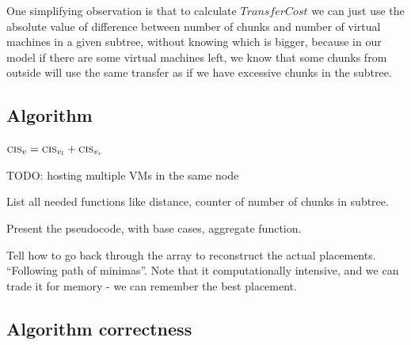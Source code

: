 One simplifying observation
is that to calculate $TransferCost$ we can just use the absolute
value of difference
between number of chunks and number of virtual machines in a given
subtree, without knowing which is bigger, because in our model if
there are some virtual machines left, we know that some chunks from
outside will use the same transfer as if we have excessive chunks in
the subtree.

\subsection{Algorithm}
\newcommand{\SumIndex}{\ensuremath{n}}
\begin{algorithm}[tbhp]
\DontPrintSemicolon %
\SetAlgoNoEnd
{}
$\textsc{cis}_{v} = \textsc{cis}_{v_l} + 
\textsc{cis}_{v_r}$\;
\For{$\SumIndex \in \{0,\dots,\Vms\}$}{
  \For{$i \in \{0,\dots,\SumIndex\}$}{
      \If{$\Opt_\SubstrateNode[\SumIndex] > \Opt_{\SubstrateNode_l}[i] + 
\Opt_{\SubstrateNode_r}[\SumIndex - i]$}{
	$\Opt_\SubstrateNode[\SumIndex] \gets \Opt_{\SubstrateNode_l}[i] + 
\Opt_{\SubstrateNode_r}[\SumIndex - i]$\;
    }
  }
  
 $bw \gets (\Vms - 
\SumIndex) \cdot \SumIndex \cdot \CostCom +   |i - 
\ChunkCount_\SubstrateNode| \cdot \CostTrans$\; 
  \eIf{$bw \leq \Capacity(\Uplink(v))$}{
    $\Opt_\SubstrateNode[\SumIndex] \gets \Opt_\SubstrateNode[\SumIndex] + bw$\;
  }{
    $\Opt_\SubstrateNode[\SumIndex] \gets \infty$\;
  }
}
%
\caption{$aggregate(\SubstrateNode \in \SubstrateNodes)$}
\label{algo:dynAggregation}
\end{algorithm}

TODO: hosting multiple VMs in the same node

List all needed functions like distance, counter of number of chunks in subtree.

Present the pseudocode, with base cases, aggregate function.

Tell how to go back through the array to reconstruct the actual placements. ``Following path of minimas''.
Note that it computationally intensive, and we can trade it for memory - we can remember the best placement.

\subsection{Algorithm correctness}

